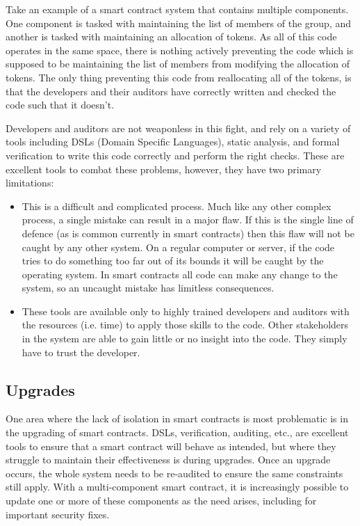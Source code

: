 \documentclass[english,a4paper]{article}
\begin{document}
Take an example of a smart contract system that contains multiple components.
One component is tasked with maintaining the list of members of the group, and
another is
tasked with maintaining an allocation of tokens. As all of this code operates in
the same space, there is nothing actively preventing the code which is supposed
to be maintaining the list of members from modifying the allocation of tokens.
The only thing preventing this code from reallocating all of the tokens, is that
the developers and their auditors have correctly written and checked the code
such that it doesn't.

Developers and auditors are not weaponless in this fight, and rely on a variety
of tools including DSLs (Domain Specific Languages), static analysis, and formal
verification to write this code correctly and perform the right checks. These
are excellent tools to combat these problems, however, they have
two primary limitations:

\begin{itemize}
  \item This is a difficult and complicated process. Much like any other complex
  process, a single mistake can result in a major flaw. If this is the single
  line of defence (as is common currently in smart contracts) then this flaw
  will not be caught by any other system.
  On a regular computer or server, if the code tries to do
  something too far out of its bounds it will be caught by the operating system.
  In smart
  contracts all code can make any change to the system, so an uncaught mistake
  has limitless consequences.
  \item These tools are available only to highly trained developers and auditors
  with the resources (i.e. time) to apply those skills to the code. Other
  stakeholders in the system are able to gain little or no insight into the
  code. They simply have to trust the developer.
\end{itemize}


\subsection{Upgrades}\label{upgrades}
One area where the lack of isolation in smart contracts is most problematic is
in the upgrading of smart contracts. DSLs, verification, auditing, etc., are
excellent tools to ensure that a smart contract will behave as intended, but
where they struggle to maintain their effectiveness is during upgrades. Once an
upgrade occurs, the whole system needs to be re-audited to ensure the same
constraints still apply.
With a multi-component smart contract, it is increasingly possible to update one
or more of these components as the need arises, including for important security
fixes.
\end{document}
